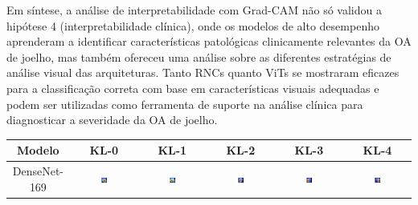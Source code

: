 Em síntese, a análise de interpretabilidade com Grad-CAM não só validou a hipótese 4 (interpretabilidade clínica), onde os modelos de alto desempenho aprenderam a identificar características patológicas clinicamente relevantes da OA de joelho, mas também ofereceu uma análise sobre as diferentes estratégias de análise visual das arquiteturas. Tanto RNCs quanto ViTs se mostraram eficazes para a classificação correta com base em características visuais adequadas e podem ser utilizadas como ferramenta de suporte na análise clínica para diagnosticar a severidade da OA de joelho.

\begin{table}
    \centering
    \begin{tabular}{|c|c|c|c|c|c|}
        \hline
        \textbf{Modelo} & \textbf{KL-0} & \textbf{KL-1} & \textbf{KL-2} & \textbf{KL-3} & \textbf{KL-4} \\ \hline
        DenseNet-169 & \includegraphics[width=0.15\textwidth]{figs/gradcams/gradcam_densenet169_kl0.png} & \includegraphics[width=0.15\textwidth]{figs/gradcams/gradcam_densenet169_kl1.png} & \includegraphics[width=0.15\textwidth]{figs/gradcams/gradcam_densenet169_kl2.png} & \includegraphics[width=0.15\textwidth]{figs/gradcams/gradcam_densenet169_kl3.png} & \includegraphics[width=0.15\textwidth]{figs/gradcams/gradcam_densenet169_kl4.png} \\ \hline

\end{tabular}
\end{table}
